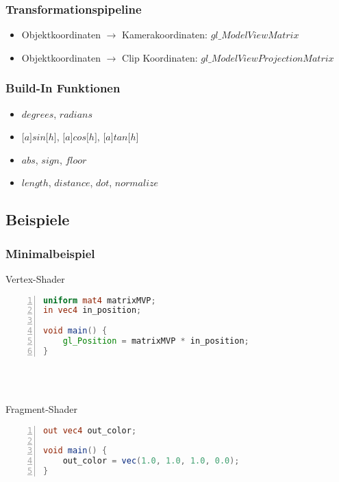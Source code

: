 \subsubsection{Transformationspipeline}
\begin{itemize}
	\item Objektkoordinaten \(\rightarrow\) Kamerakoordinaten: \(gl\_ModelViewMatrix\)
	\item Objektkoordinaten \(\rightarrow\) Clip Koordinaten: \(gl\_ModelViewProjectionMatrix\)
\end{itemize}

\subsubsection{Build-In Funktionen}
\begin{itemize}
	\item \(degrees\), \(radians\)
	\item \(\lbrack a \rbrack sin \lbrack h \rbrack\), \(\lbrack a \rbrack cos \lbrack h \rbrack\), \(\lbrack a \rbrack tan \lbrack h \rbrack\)
	\item \(abs\), \(sign\), \(floor\)
	\item \(length\), \(distance\), \(dot\), \(normalize\)
\end{itemize}


\subsection{Beispiele}

\subsubsection{Minimalbeispiel}
\begin{minipage}{\textwidth}
Vertex-Shader
\begin{lstlisting}[frame=single,numbers=left,mathescape,language=GLSL]
uniform mat4 matrixMVP;
in vec4 in_position;

void main() {
	gl_Position = matrixMVP * in_position;
}
\end{lstlisting}
\end{minipage}
\\\\
\begin{minipage}{\textwidth}
Fragment-Shader
\begin{lstlisting}[frame=single,numbers=left,mathescape,language=GLSL]
out vec4 out_color;

void main() {
	out_color = vec(1.0, 1.0, 1.0, 0.0);
}
\end{lstlisting}
\end{minipage}


